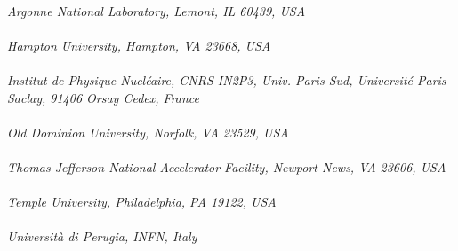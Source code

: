 \begin{titlepage}
\renewcommand{\thefootnote}{\fnsymbol{footnote}}
     \begin{center}
       \vspace*{1.0cm}
        \\
       \vspace*{0.2cm}
       \noindent \emph{Argonne National Laboratory, Lemont, IL 60439, USA} \\
       \vspace*{0.7cm}
        \\
       \vspace*{0.2cm}
       \noindent \emph{Hampton University, Hampton, VA 23668, USA} \\
       \vspace*{0.7cm}
        \\
       \vspace*{0.2cm}
       \noindent \emph{Institut de Physique Nucl\'eaire, CNRS-IN2P3, Univ. Paris-Sud, Universit\'e Paris-Saclay, 91406 Orsay Cedex, France} \\
       \vspace*{0.7cm}
        \\
       \vspace*{0.2cm}
       \noindent \emph{Old Dominion University, Norfolk, VA 23529, USA} \\
       \vspace*{0.7cm}
        \\
       \vspace*{0.2cm}
       \noindent \emph{Thomas Jefferson National Accelerator Facility, Newport News, VA 23606, USA} \\
       \vspace*{0.7cm}
        \\
       \vspace*{0.2cm}
       \noindent \emph{Temple University, Philadelphia, PA 19122, USA} \\
       \vspace*{0.7cm}
        \\
       \vspace*{0.2cm}
       \noindent \emph{Universit\`a di Perugia, INFN, Italy} \\
       \vspace*{0.7cm}

\end{center}
\end{titlepage}
